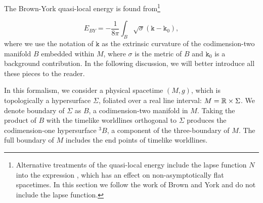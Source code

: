 The Brown-York quasi-local energy is found from\footnote{Alternative treatments of the quasi-local energy include the lapse function $N$ into the expression \cite{Katz_1988}, which has an effect on non-asymptotically flat spacetimes. In this section we follow the work of Brown and York and do not include the lapse function.}

\begin{equation}
\label{eq:BYmass}
E_{BY} = -\frac{1}{8 \pi} \int_{B} \sqrt{\sigma} (\mathtt{k} - \mathtt{k}_0),
\end{equation}
where we use the notation of $\mathtt{k}$ as the extrinsic curvature of the codimension-two manifold $B$ embedded within $M$, where $\sigma$ is the metric of $B$ and $\mathtt{k}_0$ is a background contribution. In the following discussion, we will better introduce all these pieces to the reader.

In this formalism, we consider a physical spacetime $(M,g)$, which is topologically a hypersurface $\Sigma$, foliated over a real line interval: $M = {\mathbb{R}} \times \Sigma$. We denote boundary of $\Sigma$ as $B$, a codimension-two manifold in $M$. Taking the product of $B$ with the timelike worldlines orthogonal to $\Sigma$ produces the codimension-one hypersurface ${}^3B$, a component of the three-boundary of $M$. The full boundary of $M$ includes the end points of timelike worldlines.

